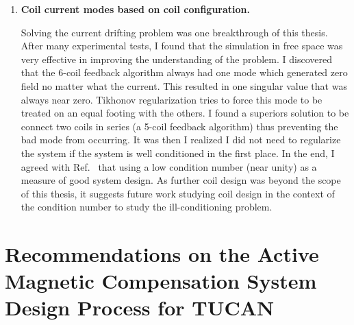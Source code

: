 \begin{enumerate}
\item {\bf Coil current modes based on coil configuration.}  

Solving the current drifting problem was one breakthrough of this thesis. After many experimental tests, I found that the simulation in free space was very effective in improving the understanding of the problem. I discovered that the 6-coil feedback algorithm always had one mode which generated zero field no matter what the current. This resulted in one singular value that was always near zero. Tikhonov regularization tries to force this mode to be treated on an equal footing with the others. I found a superiors solution to be connect two coils in series (a 5-coil feedback algorithm) thus preventing the bad mode from occurring. It was then I realized I did not need to regularize the system if the system is well conditioned in the first place. In the end, I agreed with Ref.~\cite{rawlik} that using a low condition number (near unity) as a measure of good system design. As further coil design was beyond the scope of this thesis, it suggests future work studying coil design in the context of the condition number to study the ill-conditioning problem.

\end{enumerate}



\section{Recommendations on the Active Magnetic Compensation System Design Process for TUCAN}

